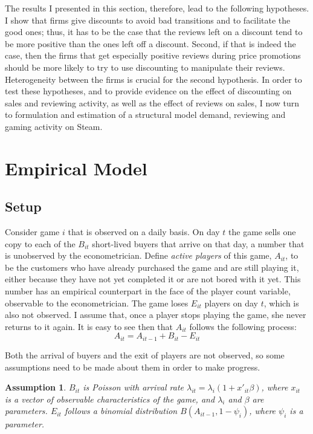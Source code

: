 \documentclass[
  12pt,
  pagebackref]{article}
\newtheorem{assumption}{Assumption}[section]
\begin{document}
The results I presented in this section, therefore, lead to the
following hypotheses. I show that firms give discounts to avoid bad
transitions and to facilitate the good ones; thus, it has to be the case
that the reviews left on a discount tend to be more positive than the
ones left off a discount. Second, if that is indeed the case, then the
firms that get especially positive reviews during price promotions
should be more likely to try to use discounting to manipulate their
reviews. Heterogeneity between the firms is crucial for the second
hypothesis. In order to test these hypotheses, and to provide evidence
on the effect of discounting on sales and reviewing activity, as well as
the effect of reviews on sales, I now turn to formulation and estimation
of a structural model demand, reviewing and gaming activity on Steam.

\hypertarget{empirical-model}{%
\section{Empirical Model}\label{empirical-model}}

\hypertarget{setup}{%
\subsection{Setup}\label{setup}}

Consider game \(i\) that is observed on a daily basis. On day \(t\) the
game sells one copy to each of the \(B_{it}\) short-lived buyers that
arrive on that day, a number that is unobserved by the econometrician.
Define \emph{active players} of this game, \(A_{it}\), to be the
customers who have already purchased the game and are still playing it,
either because they have not yet completed it or are not bored with it
yet. This number has an empirical counterpart in the face of the player
count variable, observable to the econometrician. The game loses
\(E_{it}\) players on day \(t\), which is also not observed. I assume
that, once a player stops playing the game, she never returns to it
again. It is easy to see then that \(A_{it}\) follows the following
process: \begin{equation}\label{activeProccess}
  A_{it} = A_{it-1} + B_{it} - E_{it}
\end{equation}

Both the arrival of buyers and the exit of players are not observed, so
some assumptions need to be made about them in order to make progress.

\begin{assumption}\label{arrivalAssumptions}
$B_{it}$ is Poisson with arrival rate $\lambda_{it} = \lambda_i(1+x'_{it}\beta)$, where $x_{it}$ is a vector of observable characteristics of the game, and $\lambda_i$ and $\beta$ are parameters. $E_{it}$ follows a binomial distribution $B(A_{it-1}, 1-\psi_i)$, where $\psi_i$ is a parameter.
\end{assumption}
\end{document}
